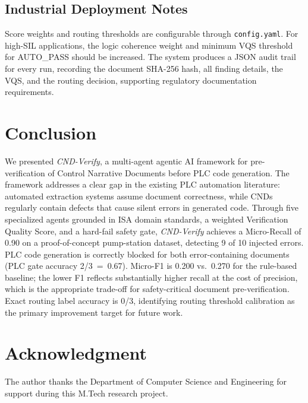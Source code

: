\documentclass[journal]{IEEEtran}
\newcommand{\sys}{\textit{CND-Verify}}
\begin{document}
\subsection{Industrial Deployment Notes}

Score weights and routing thresholds are configurable through \texttt{config.yaml}.
For high-SIL applications, the logic coherence weight and minimum VQS threshold
for AUTO\_PASS should be increased. The system produces a JSON audit trail for
every run, recording the document SHA-256 hash, all finding details, the VQS,
and the routing decision, supporting regulatory documentation requirements.

\section{Conclusion}
\label{sec:conclusion}

We presented \sys{}, a multi-agent agentic AI framework for pre-verification
of Control Narrative Documents before PLC code generation. The framework
addresses a clear gap in the existing PLC automation literature: automated
extraction systems assume document correctness, while CNDs regularly contain
defects that cause silent errors in generated code. Through five specialized
agents grounded in ISA domain standards, a weighted Verification Quality Score,
and a hard-fail safety gate, \sys{} achieves a Micro-Recall of 0.90 on a
proof-of-concept pump-station dataset, detecting 9 of 10 injected errors. PLC
code generation is correctly blocked for both error-containing documents (PLC
gate accuracy 2/3~=~0.67). Micro-F1 is 0.200 vs.\ 0.270 for the rule-based
baseline; the lower F1 reflects substantially higher recall at the cost of
precision, which is the appropriate trade-off for safety-critical document
pre-verification. Exact routing label accuracy is 0/3, identifying routing
threshold calibration as the primary improvement target for future work.

\section*{Acknowledgment}

The author thanks the Department of Computer Science and Engineering for
support during this M.Tech research project.
\end{document}
